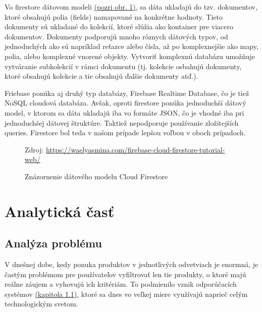 Vo firestore dátovom modeli \hyperref[firestore]{(pozri obr. \ref{firestore})}, sa dáta ukladajú do tzv. dokumentov, ktoré obsahujú polia (fields) namapované na konkrétne hodnoty. Tieto dokumenty sú ukladané do kolekcií, ktoré slúžia ako kontainer pre viacero dokumentov. Dokumenty podporujú mnoho rôznych dátových typov, od jednoduchých ako sú napríklad reťazce alebo čísla, až po komplexnejšie ako mapy, polia, alebo komplexné vnorené objekty. Vytvoriť komplexnú databázu umožňuje vytváranie subkolekcií v rámci dokumentu (tj. kolekcie osbahujú dokumenty, ktoré obsahujú kolekcie a tie obsahujú ďalšie dokumenty atď.). \cite{firestoredoc}
  
Friebase ponúka aj druhý typ databázy, Firebase Realtime Database, čo je tiež NoSQL cloudová databáza. Avšak, oproti firestore ponúka jednoduchší dátový model, v ktorom sa dáta ukladajú iba vo formáte JSON, čo je vhodné iba pri jednoduchšej dátovej štruktúre. Taktiež nepodporuje používanie zložitejších queries. Firestore bol teda v našom prípade lepšou voľbou v oboch prípadoch. \\

\begin{figure}[!htbp]
  \centering  
  \def\stackalignment{c}
           {\scriptsize%
            Zdroj: \url{https://waelyasmina.com/firebase-cloud-firestore-tutorial-web/}}
	\caption{Znázornenie dátového modelu Cloud Firestore}  
  \label{firestore}
\end{figure}




\section{Analytická časť}
\subsection{Analýza problému}
V dnešnej dobe, kedy ponuka produktov v jednotlivých odvetviach je enormná, je častým problémom pre používateľov vyfiltrovať len tie produkty, o ktoré majú reálne záujem a vyhovujú ich kritériám. To podmienilo vznik odporúčacích systémov \hyperref[sec:odporucacie systemy]{(kapitola 1.1)}, ktoré sa dnes vo veľkej miere využívajú naprieč celým technologickým svetom. 

